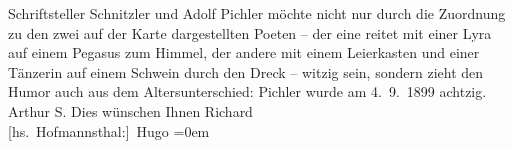 \begin{ledgroupsized}[t]{13cm}
{{{                  Schriftsteller Schnitzler und Adolf Pichler möchte nicht nur durch die Zuordnung zu den zwei auf
                  der Karte dargestellten Poeten – der eine reitet mit einer Lyra auf einem Pegasus zum
                  Himmel, der andere mit einem Leierkasten und einer Tänzerin auf einem Schwein
                  durch den Dreck – witzig sein, sondern zieht den Humor auch aus dem
                  Altersunterschied: Pichler wurde am
                     4. 9. 1899 achtzig.}}}\label{K_L00978_1h}\hspace*{2.5em} Arthur S.\pend
           \pstart
           Dies wünschen Ihnen\pend
           \pstart
           \spacefill\mbox{Richard}{\\[\baselineskip]}\spacefill\mbox{{[}hs. Hofmannsthal:{]} Hugo}\pend
           \leftskip=0em{}
         
         \endnumbering{}\end{ledgroupsized}  \newcommand{\dateiname}{L00978}\newcommand{\titel}{Richard Beer-Hofmann und Hugo von Hofmannsthal an Arthur Schnitzler, 19. 9. 1899}\newcommand{\editorInnen}{Martin Anton Müller und Gerd-Hermann Susen}
      